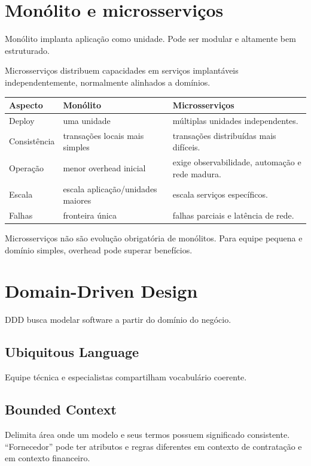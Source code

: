 \section{Monólito e microsserviços}

Monólito implanta aplicação como unidade. Pode ser modular e altamente bem estruturado.

Microsserviços distribuem capacidades em serviços implantáveis independentemente, normalmente alinhados a domínios.

\begin{table}[ht]
\centering
\small
\begin{tabularx}{\textwidth}{l X X}
\toprule
Aspecto & Monólito & Microsserviços \\
\midrule
Deploy & uma unidade & múltiplas unidades independentes. \\
Consistência & transações locais mais simples & transações distribuídas mais difíceis. \\
Operação & menor overhead inicial & exige observabilidade, automação e rede madura. \\
Escala & escala aplicação/unidades maiores & escala serviços específicos. \\
Falhas & fronteira única & falhas parciais e latência de rede. \\
\bottomrule
\end{tabularx}
\end{table}

Microsserviços não são evolução obrigatória de monólitos. Para equipe pequena e domínio simples, overhead pode superar benefícios.

\section{Domain-Driven Design}

DDD busca modelar software a partir do domínio do negócio.

\subsection{Ubiquitous Language}

Equipe técnica e especialistas compartilham vocabulário coerente.

\subsection{Bounded Context}

Delimita área onde um modelo e seus termos possuem significado consistente. ``Fornecedor'' pode ter atributos e regras diferentes em contexto de contratação e em contexto financeiro.

